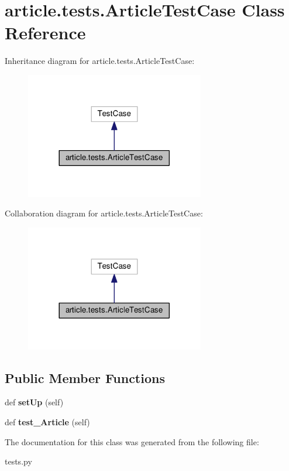 \hypertarget{classarticle_1_1tests_1_1ArticleTestCase}{}\section{article.\+tests.\+Article\+Test\+Case Class Reference}
\label{classarticle_1_1tests_1_1ArticleTestCase}


Inheritance diagram for article.\+tests.\+Article\+Test\+Case\+:
\nopagebreak
\begin{figure}[H]
\begin{center}
\leavevmode
\includegraphics[width=221pt]{classarticle_1_1tests_1_1ArticleTestCase__inherit__graph}
\end{center}
\end{figure}


Collaboration diagram for article.\+tests.\+Article\+Test\+Case\+:
\nopagebreak
\begin{figure}[H]
\begin{center}
\leavevmode
\includegraphics[width=221pt]{classarticle_1_1tests_1_1ArticleTestCase__coll__graph}
\end{center}
\end{figure}
\subsection*{Public Member Functions}
\begin{DoxyCompactItemize}
\item 
\hypertarget{classarticle_1_1tests_1_1ArticleTestCase_a2b468a7bb6ccf7dc9ce29d8b5bf664ab}{}def {\bfseries set\+Up} (self)\label{classarticle_1_1tests_1_1ArticleTestCase_a2b468a7bb6ccf7dc9ce29d8b5bf664ab}

\item 
\hypertarget{classarticle_1_1tests_1_1ArticleTestCase_a03d845b8569bdac1c0e6c2051f7c0129}{}def {\bfseries test\+\_\+\+Article} (self)\label{classarticle_1_1tests_1_1ArticleTestCase_a03d845b8569bdac1c0e6c2051f7c0129}

\end{DoxyCompactItemize}


The documentation for this class was generated from the following file\+:\begin{DoxyCompactItemize}
\item 
tests.\+py\end{DoxyCompactItemize}
